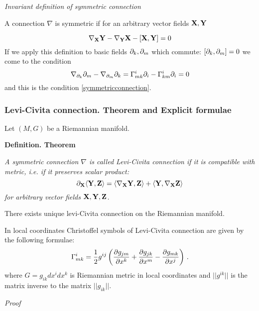 \documentclass[12pt]{article}
\theoremstyle{theorem}
\numberwithin{equation}{section}
\begin{document}
  \m

  {\small

   \centerline {\it Invariant definition of symmetric connection}

  A connection $\nabla$ is symmetric if for an arbitrary vector fields ${\bf X},{\bf Y}$

  \begin{equation}\label{symmetricconnectioninvariant}
    \nabla_{\bf X} {\bf Y}-\nabla_{\bf Y} {\bf X}-[{\bf X},{\bf Y}]=0
  \end{equation}
  If we apply this definition to basic fields $\partial_k,\partial_m$ which commute: $[\partial_k,\partial_m]=0$
  we come to the
  condition
          $$
     \nabla_{\partial_k}\partial_m-\nabla_{\partial_m}\partial_k=\Gamma_{mk}^i\partial_i-\Gamma_{km}^i\partial_i=0
          $$
 and this is the condition  \eqref{symmetricconnection}.
  }



  \subsubsection {Levi-Civita connection. Theorem and Explicit formulae}
Let $(M, G)$ be a Riemannian manifold.

{\bf Definition. Theorem}

{\it A symmetric connection $\nabla$ is called Levi-Civita connection if it is compatible with metric, i.e.
if it preserves scalar product:
        \begin{equation}\label{connpreservingmetric}
  \partial_{\bf X}\langle{\bf Y},{\bf Z}\rangle=\langle\nabla_{\bf X}{\bf Y},{\bf Z}\rangle+\langle{\bf Y},\nabla_{\bf X}{\bf Z}\rangle
        \end{equation}
        for arbitrary vector fields ${\bf X},{\bf Y},{\bf Z}$.

  There exists unique levi-Civita connection on the Riemannian manifold.

  In local coordinates Christoffel symbols of Levi-Civita connection are given by the following formulae:
 \begin{equation}\label{levi-civitaformula}
    \Gamma^i_{mk}={1\over 2}g^{ij}\left({\partial g_{jm}\over\partial x^k}+
    {\partial g_{jk}\over\partial x^m}-{\partial g_{mk}\over \partial x^j}\right)\,.
 \end{equation}
 where $G=g_{ik}dx^idx^k$ is Riemannian metric in local coordinates and
 $||g^{ik}||$ is the matrix inverse to the matrix $||g_{ik}||$.

 }

 {\sl Proof}
\end{document}
